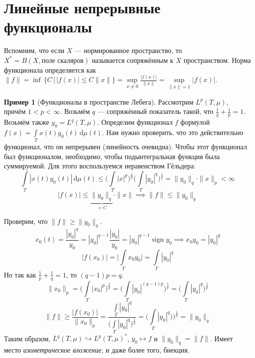 \documentclass[11pt,openany,a4paper]{scrartcl}
\theoremstyle{plain}
\theoremstyle{definition}
\newtheorem{example}[theorem]{Пример}
\newcommand{\dif}{\, \mathrm d}
\DeclareMathOperator{\sign}{sign}
\begin{document}
\section{Линейные непрерывные функционалы}

Вспомним, что если $X$ — нормированное пространство, то
$X^\ast = B(X, \text{поле скаляров})$ называется сопряжённым к $X$ пространством.
Норма функционала определяется как $\|f\| = \inf\,\{C\,\big|\,|f(x)|
\leqslant C\|x\|\} =
\sup\limits_{x \neq 0}\frac{|f(x)|}{\|x\|} = \sup\limits_{\|x\|=1} |f(x)|$.

\begin{example}[Функционалы в пространстве Лебега]
        Рассмотрим $L^p(T, \mu)$, причём
        $1 < p < \infty$. Возьмём $q$ — сопряжённый показатель такой, что
        $\frac{1}{q} + \frac{1}{p} = 1$. Возьмём также $y_0 = L^q(T, \mu)$.
        Определим функционал $f$ формулой
        $f(x) = \int\limits_T x(t)y_0(t)\dif \mu(t)$. Нам нужно проверить, что
        это действительно функционал, что он непрерывен (линейность очевидна).
        Чтобы этот функционал был функционалом, необходимо, чтобы
        подынтегральная функция была суммируемой. Для этого воспользуемся
        неравенством Гёльдера:
        $$
        \int\limits_T |x(t)y_0(t)| \dif \mu(t) \leqslant
        \bigg(\int\limits_T |x|^p\bigg)^\frac{1}{p}
        \bigg(\int\limits_T |y_0|^q\bigg)^\frac{1}{q} = \|y_0\|_q\cdot \|x\|_p <
        \infty
        $$
        $$
        |f(x)| \leqslant \underbrace{\|y_0\|_q}_{=C} \cdot \|x\|
        \implies \|f\| \leqslant \|y_0\|_q
        $$
        
        Проверим, что $\|f\| \geqslant \|y_0\|_q$.
        $$
        x_0(t) = \frac{|y_0|^q}{y_0} = |y_0|^{q-1} \frac{|y_0|}{y_0} =
        |y_0|^{q-1}\sign y_0
        \implies x_0y_0 = |y_0|^q
        $$
        $$
        |f(x_0)| = \bigg|\int\limits_T x_0y_0\bigg| = \int\limits_T|y_0|^q
        $$
        Но так как $\frac{1}{p} + \frac{1}{q} = 1$, то $(q-1)p = q$.
        $$
        \|x_0\|_p = \bigg(\int\limits_T |x_0|^p\bigg)^\frac{1}{p} =
        \bigg(\int\limits_T |y_0|^{(q-1)p}\bigg)^\frac{1}{p} =
        \bigg(\int\limits_T |y_0|^q\bigg)^\frac{1}{p}
        $$
        $$
        \|f\|\geqslant \frac{|f(x_0)|}{\|x_0\|_p} =
        \frac{\int\limits_T |y_0|^q}{\bigg(\int\limits_T|y_0|^q\bigg)^\frac{1}{p}} =
        \bigg(\int\limits_T |y_0|^q)\bigg)^\frac{1}{q} = \|y_0\|_q
        $$
        Таким образом, $L^q(T, \mu) \hookrightarrow L^p(T, \mu)^\ast$,
        $y_0 \mapsto f$ и $\|y_0\|_q = \|f\|$. Имеет место
        \emph{изометрическое вложение}, и даже более того, биекция.
\end{example}
\end{document}
